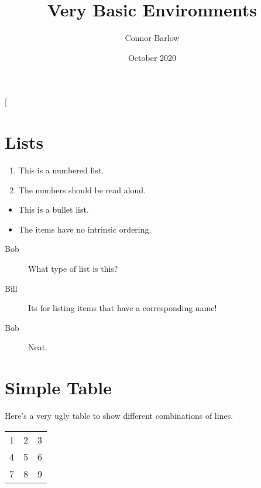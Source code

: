 [\documentclass{article}, \usepackage[utf8]{inputenc}, \usepackage{amsmath}, \title{Very Basic Environments}, \author{Connor Barlow}, \date{October 2020}, \newtheorem{thm}{Theorem}, \newtheorem{corr}{Corollary},
\begin{document}
\maketitle

\section{Lists}
\begin{enumerate}
    \item This is a numbered list.
    \item The numbers should be read aloud.
\end{enumerate}
\begin{itemize}
    \item This is a bullet list.
    \item The items have no intrinsic ordering.
\end{itemize}
\begin{description}
    \item[Bob] What type of list is this?
    \item[Bill] Its for listing items that have a corresponding name!
    \item[Bob] Neat.
\end{description}
\section{Simple Table}
\par
Here's a very ugly table to show different combinations of lines.
\par
\begin{tabular}{|l||cr}
1 & 2 & 3 \\
4 & 5 & 6 \\
\hline
7 & 8 & 9 \\
\hline \hline
\end{tabular}
\end{document}
